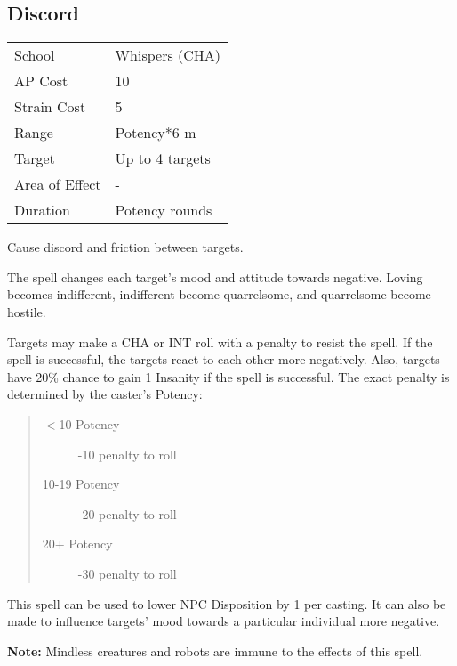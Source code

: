 \documentclass[11pt,a4paper,twocolumn]{book}
\begin{document}
\subsection*{Discord}
{
	\begin{tabu} to 75mm{| X[l,4] | X[l,7] |}
		\hline
		School         & Whispers (CHA)  \\
		AP Cost        & 10              \\
		Strain Cost    & 5               \\
		Range          & Potency*6 m     \\
		Target         & Up to 4 targets \\
		Area of Effect & -               \\
		Duration       & Potency rounds  \\ \hline
	\end{tabu}
	
}

\medskip

Cause discord and friction between targets.

The spell changes each target's mood and attitude towards negative. Loving becomes indifferent, indifferent become quarrelsome, and quarrelsome become hostile.

Targets may make a CHA or INT roll with a penalty to resist the spell. If the spell is successful, the targets react to each other more negatively. Also, targets have 20\% chance to gain 1 Insanity if the spell is successful. The exact penalty is determined by the caster's Potency: 

\begin{quote}
	\begin{description}
		\item[$<$10 Potency] 	-10 penalty to roll
		\item[10-19 Potency] 	-20 penalty to roll
		\item[20+ Potency] 	-30 penalty to roll
	\end{description}
\end{quote}

This spell can be used to lower NPC Disposition by 1 per casting. It can also be made to influence targets' mood towards a particular individual more negative.

\textbf{Note:} Mindless creatures and robots are immune to the effects of this spell.
\end{document}
